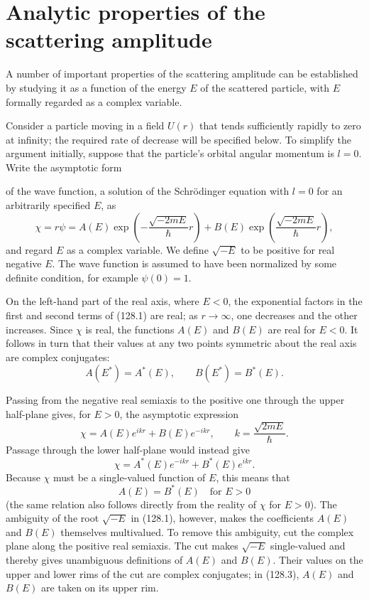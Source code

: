 \section{Analytic properties of the scattering amplitude}

A number of important properties of the scattering amplitude can be established by studying it as a function of the energy $E$ of the scattered particle, with $E$ formally regarded as a complex variable.

Consider a particle moving in a field $U(r)$ that tends sufficiently rapidly to zero at infinity; the required rate of decrease will be specified below. To simplify the argument initially, suppose that the particle's orbital angular momentum is $l=0$. Write the asymptotic form

of the wave function, a solution of the Schrödinger equation with $l=0$ for an arbitrarily specified $E$, as
\begin{equation}
 \chi=r\psi=A(E)\exp\left(-\frac{\sqrt{-2mE}}{\hbar}r\right)
 +B(E)\exp\left(\frac{\sqrt{-2mE}}{\hbar}r\right),
 \tag{128.1}
\end{equation}
and regard $E$ as a complex variable. We define $\sqrt{-E}$ to be positive for real negative $E$. The wave function is assumed to have been normalized by some definite condition, for example $\psi(0)=1$.

On the left-hand part of the real axis, where $E<0$, the exponential factors in the first and second terms of (128.1) are real; as $r\to\infty$, one decreases and the other increases. Since $\chi$ is real, the functions $A(E)$ and $B(E)$ are real for $E<0$. It follows in turn that their values at any two points symmetric about the real axis are complex conjugates:
\begin{equation}
 A(E^*)=A^*(E),\qquad B(E^*)=B^*(E).
 \tag{128.2}
\end{equation}

Passing from the negative real semiaxis to the positive one through the upper half-plane gives, for $E>0$, the asymptotic expression
\begin{equation}
 \chi=A(E)e^{ikr}+B(E)e^{-ikr},\qquad k=\frac{\sqrt{2mE}}{\hbar}.
 \tag{128.3}
\end{equation}
Passage through the lower half-plane would instead give
\[
 \chi=A^*(E)e^{-ikr}+B^*(E)e^{ikr}.
\]
Because $\chi$ must be a single-valued function of $E$, this means that
\begin{equation}
 A(E)=B^*(E)\quad\text{for }E>0
 \tag{128.4}
\end{equation}
(the same relation also follows directly from the reality of $\chi$ for $E>0$). The ambiguity of the root $\sqrt{-E}$ in (128.1), however, makes the coefficients $A(E)$ and $B(E)$ themselves multivalued. To remove this ambiguity, cut the complex plane along the positive real semiaxis. The cut makes $\sqrt{-E}$ single-valued and thereby gives unambiguous definitions of $A(E)$ and $B(E)$. Their values on the upper and lower rims of the cut are complex conjugates; in (128.3), $A(E)$ and $B(E)$ are taken on its upper rim.

